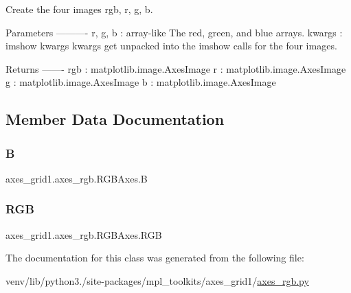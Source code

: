 \begin{DoxyVerb}Create the four images {rgb, r, g, b}.

Parameters
----------
r, g, b : array-like
    The red, green, and blue arrays.
kwargs : imshow kwargs
    kwargs get unpacked into the imshow calls for the four images.

Returns
-------
rgb : matplotlib.image.AxesImage
r : matplotlib.image.AxesImage
g : matplotlib.image.AxesImage
b : matplotlib.image.AxesImage
\end{DoxyVerb}
 

\subsection{Member Data Documentation}
\mbox{\label{classaxes__grid1_1_1axes__rgb_1_1RGBAxes_ac55a6c9b2fabc36b474456ca15a8ff51}} 
\subsubsection{\texorpdfstring{B}{B}}
{\footnotesize\ttfamily axes\+\_\+grid1.\+axes\+\_\+rgb.\+R\+G\+B\+Axes.\+B}

\mbox{\label{classaxes__grid1_1_1axes__rgb_1_1RGBAxes_a97c4e5c3c44c5e856747acd9222faa9a}} 
\subsubsection{\texorpdfstring{R\+GB}{RGB}}
{\footnotesize\ttfamily axes\+\_\+grid1.\+axes\+\_\+rgb.\+R\+G\+B\+Axes.\+R\+GB}



The documentation for this class was generated from the following file\+:\begin{DoxyCompactItemize}
\item 
venv/lib/python3./site-\/packages/mpl\+\_\+toolkits/axes\+\_\+grid1/\hyperlink{axes__grid1_2axes__rgb_8py}{axes\+\_\+rgb.\+py}\end{DoxyCompactItemize}
